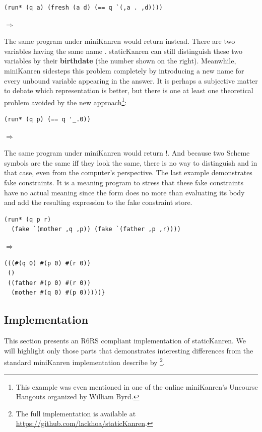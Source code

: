 \begin{lstlisting}
(run* (q a) (fresh (a d) (== q `(,a . ,d))))
\end{lstlisting}
$\Rightarrow$ 

The same program under miniKanren would return  instead. There are two variables having the same name . staticKanren can still distinguish these two variables by their \textbf{birthdate} (the number shown on the right). Meanwhile, miniKanren sidesteps this problem completely by introducing a new name for every unbound variable appearing in the answer. It is perhaps a subjective matter to debate which representation is better, but there is one at least one theoretical problem avoided by the new approach\footnote{This example was even mentioned in one of the online miniKanren's Uncourse Hangouts organized by William Byrd.}:

\begin{lstlisting}
(run* (q p) (== q '_.0))
\end{lstlisting}
$\Rightarrow$ 

The same program under miniKanren would return !. And because two Scheme symbols are the same iff they look the same, there is no way to distinguish  and  in that case, even from the computer's perspective. The last example demonstrates fake constraints. It is a meaning program to stress that these fake constraints have no actual meaning since the  form does no more than evaluating its body and add the resulting expression to the fake constraint store.
\begin{lstlisting}
(run* (q p r)
  (fake `(mother ,q ,p)) (fake `(father ,p ,r))))
\end{lstlisting}

$\Rightarrow$
\begin{lstlisting}
(((#(q 0) #(p 0) #(r 0))
 ()
 ((father #(p 0) #(r 0))
  (mother #(q 0) #(p 0)))))}
\end{lstlisting}



\subsection{Implementation}\label{static_imp}
This section presents an R6RS compliant implementation of staticKanren. We will highlight only those parts that demonstrates interesting differences from the standard miniKanren implementation describe by \textcite{byrdphd}\footnote{The full implementation is available at \url{https://github.com/lackhoa/staticKanren}.}.

